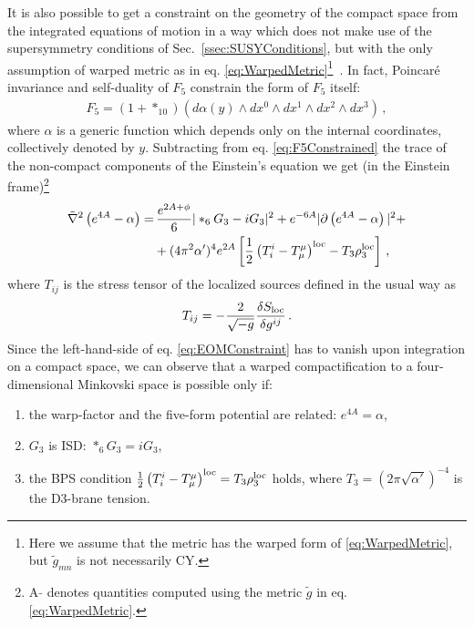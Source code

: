 \documentclass[12pt,a4paper]{book}
\begin{document}
It is also possible to get a constraint on the geometry of the compact space from the integrated equations of motion in a way which does not make use of the supersymmetry conditions of Sec.~\ref{ssec:SUSYConditions}, but with the only assumption of warped metric as in eq. \eqref{eq:WarpedMetric}\footnote{Here we assume that the metric has the warped form of \eqref{eq:WarpedMetric}, but $\tilde{g}_{mn}$ is not necessarily CY.}~\cite{Giddings:2001yu}. In fact, Poincar\'e invariance and self-duality of $F_5$ constrain the form of $F_5$ itself:
\begin{align}
\label{eq:F5Constrained}
F_5 = (1 + *_{10})\left(d \alpha(y) \wedge dx^0 \wedge dx^1 \wedge dx^2 \wedge dx^3\right)\,,
\end{align}
where $\alpha$ is a generic function which depends only on the internal coordinates, collectively denoted by $y$. Subtracting from eq. \eqref{eq:F5Constrained} the trace of the non-compact components of the Einstein's equation we get (in the Einstein frame)\footnote{A $\widetilde{}$ denotes quantities computed using the metric $\widetilde{g}$ in eq. \eqref{eq:WarpedMetric}.}
\begin{align}
\label{eq:EOMConstraint}
\tilde{\nabla}^2 \left(e^{4A} - \alpha\right) =&\, \frac{e^{2A + \phi}}{6} |*_6 G_3 - i G_3|^2 + e^{-6A} |\partial\left(e^{4A} - \alpha\right)|^2 + \nonumber\\
&+ (4 \pi^2 \alpha')^4 e^{2A} \left[\frac{1}{2} \left(T^i_i - T^\mu_\mu\right)^{\rm loc} - T_3 \rho_3^{\rm loc}\right] \,,
\end{align}
where $T_{ij}$ is the stress tensor of the localized sources defined in the usual way as
\begin{align}
\label{eq:StressTensorSources}
T_{ij} = -\frac{2}{\sqrt{-g}}\frac{\delta S_{\rm loc}}{\delta g^{ij}} \,.
\end{align}
Since the left-hand-side of eq. \eqref{eq:EOMConstraint} has to vanish upon integration on a compact space, we can observe that a warped compactification to a four-dimensional Minkovski space is possible only if:
\begin{enumerate}
 \item the warp-factor and the five-form potential are related: $e^{4A} = \alpha$,
 \item $G_3$ is ISD: $*_6 G_3 = i G_3$,
 \item the BPS condition $\frac{1}{2} \left(T^i_i - T^\mu_\mu\right)^{\rm loc} = T_3 \rho_3^{\rm loc}$ holds, where $T_3 = \left(2 \pi \sqrt{\alpha'}\right)^{-4}$ is the D3-brane tension.
\end{enumerate}
\end{document}
